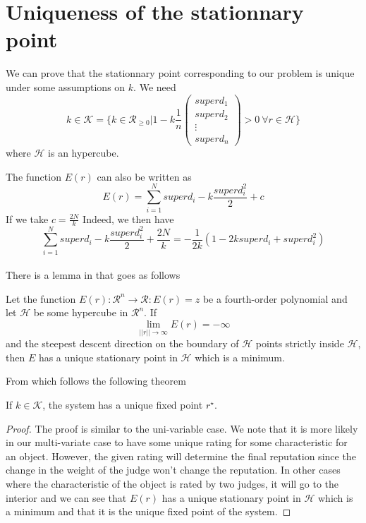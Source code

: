 \section{Uniqueness of the stationnary point}

We can prove that the stationnary point corresponding to our problem is unique under some assumptions on $k$.
We need $$k\in \mathcal{K} = \{k\in \mathcal{R}_{\geq 0} | 1 - k \frac{1}{n}\begin{pmatrix} superd_1 \\ superd_2 \\ \vdots \\ superd_n \end{pmatrix} >0 \: \forall r \in \mathcal{H} \}$$
where $\mathcal{H}$ is an hypercube.

The function $E(r)$ can also be written as 
$$ E(r) = \sum_{i=1}^N superd_i - k \frac{superd_i^2}{2} + c$$
If we take $c = \frac{2N}{k}$
Indeed, we then have $$ \sum_{i=1}^N superd_i - k \frac{superd_i^2}{2} + \frac{2N}{k} = -\frac{1}{2k} (1 - 2ksuperd_i + superd_i^2)$$
\\

There is a lemma in \cite{Cristo1} that goes as follows
\begin{lemma}
Let the function $E(r) : \mathcal{R}^n \rightarrow \mathcal{R} : E(r) = z $ be a fourth-order polynomial and let $\mathcal{H}$ be some hypercube in $\mathcal{R}^n$. If 
$$\lim_{||r||\rightarrow \infty} E(r) = - \infty $$
and the steepest descent direction on the boundary of $\mathcal{H}$ points strictly inside $\mathcal{H}$, then $E$ has a unique stationary point in $\mathcal{H}$ which is a minimum.
\end{lemma}
From which follows the following theorem
\begin{theorem}
If $k \in \mathcal{K}$, the system has a unique fixed point $r^{\star}$.
\begin{proof}
The proof is similar to the uni-variable case. We note that it is more likely in our multi-variate case to have some unique rating for some characteristic for an object. However, the given rating will determine the final reputation since the change in the weight of the judge won't change the reputation. In other cases where the characteristic of the object is rated by two judges, it will go to the interior and we can see that $E(r)$ has a unique stationary point in $\mathcal{H}$ which is a minimum and that it is the unique fixed point of the system.
\end{proof}
\end{theorem}




